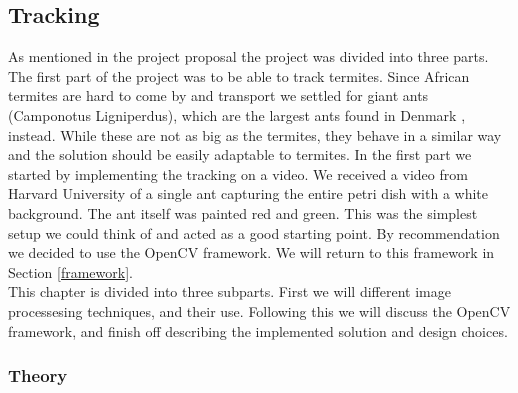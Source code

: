 
\subsection{Tracking}
\label{tracking}
As mentioned in the project proposal the project was divided into three parts. The first part of the project was to be able to track termites. Since African termites are hard to come by and transport we settled for giant ants (Camponotus Ligniperdus), which are the largest ants found in Denmark \cite{fogn}, instead. While these are not as big as the termites, they behave in a similar way and the solution should be easily adaptable to termites. In the first part we started by implementing the tracking on a video. We received a video from Harvard University of a single ant capturing the entire petri dish with a white background. The ant itself was painted red and green. This was the simplest setup we could think of and acted as a good starting point. By recommendation we decided to use the OpenCV \cite{opencv} framework. We will return to this framework in Section \ref{framework}.\\

This chapter is divided into three subparts. First we will different image processesing techniques, and their use. Following this we will discuss the OpenCV framework, and finish off describing the implemented solution and design choices.

% 
% 

\subsubsection{Theory} \mbox{}\par
\label{sec:tracking_theory}


